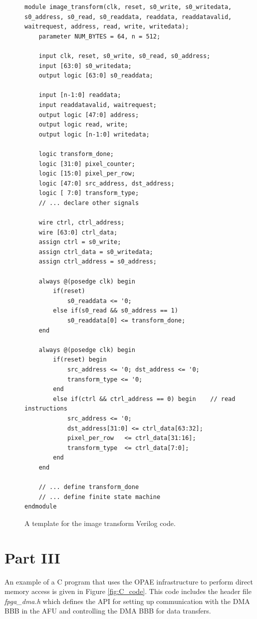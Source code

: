\documentclass[epsfig,10pt,fullpage]{article}
\begin{document}
\begin{figure}[h]
\begin{center}
\begin{minipage}[h]{15 cm}
\begin{lstlisting}[name=code]
module image_transform(clk, reset, s0_write, s0_writedata, s0_address, s0_read, s0_readdata, readdata, readdatavalid, waitrequest, address, read, write, writedata);
    parameter NUM_BYTES = 64, n = 512;

    input clk, reset, s0_write, s0_read, s0_address;
    input [63:0] s0_writedata;
    output logic [63:0] s0_readdata;

    input [n-1:0] readdata;
    input readdatavalid, waitrequest;
    output logic [47:0] address;
    output logic read, write;
    output logic [n-1:0] writedata;

    logic transform_done;
    logic [31:0] pixel_counter;
    logic [15:0] pixel_per_row;
    logic [47:0] src_address, dst_address;
    logic [ 7:0] transform_type;
    // ... declare other signals

    wire ctrl, ctrl_address;
    wire [63:0] ctrl_data;
    assign ctrl = s0_write;
    assign ctrl_data = s0_writedata;
    assign ctrl_address = s0_address;

    always @(posedge clk) begin
        if(reset)
            s0_readdata <= '0;
        else if(s0_read && s0_address == 1)
            s0_readdata[0] <= transform_done;
    end

    always @(posedge clk) begin
        if(reset) begin
            src_address <= '0; dst_address <= '0; 
            transform_type <= '0;
        end
        else if(ctrl && ctrl_address == 0) begin    // read instructions
            src_address <= '0;
            dst_address[31:0] <= ctrl_data[63:32];
            pixel_per_row   <= ctrl_data[31:16];
            transform_type  <= ctrl_data[7:0];
        end
    end

    // ... define transform_done
    // ... define finite state machine
endmodule

\end{lstlisting}
\end{minipage}
\caption{A template for the image transform Verilog code.}
\label{fig:templatePart2}
\end{center}
\end{figure}

\section*{Part III}
An example of a C program that uses the OPAE infrastructure to perform direct memory access is given in Figure \ref{fig:C_code}. This code includes the header file {\it fpga\_dma.h} which defines the API for setting up communication with the DMA BBB in the AFU and controlling the DMA BBB for data transfers. \\
\end{document}
